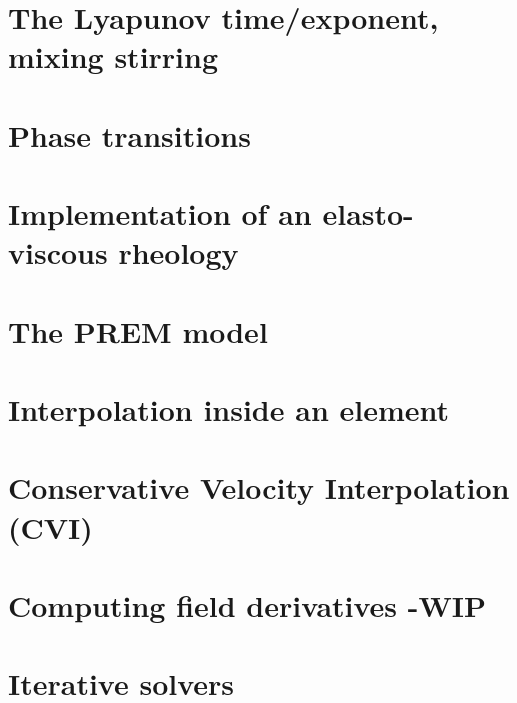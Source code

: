\section{The Lyapunov time/exponent, mixing stirring}\label{ss:lyapunov} %
\newpage %
\section{Phase transitions}\label{ss:phasetransitions} %
\newpage %
\section{Implementation of an elasto-viscous rheology} \label{ss:evrheo}  %
\newpage %
\section{The PREM model} \label{ss:prem}  %
\newpage %
\section{Interpolation inside an element} \label{ss:bern}  %
\newpage %
\section{Conservative Velocity Interpolation (CVI)} \label{sec:cvi} %
\newpage %
\section{Computing field derivatives -WIP} \label{ss:nodderiv}  %
\newpage %
\section{Iterative solvers \label{ss:itsolvers}}  %
\newpage %
